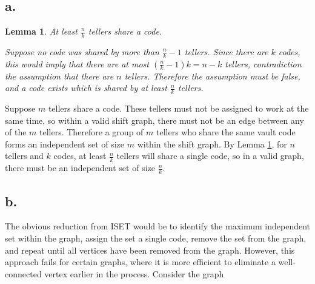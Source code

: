 \documentclass[11pt]{article}
\newtheorem{lem}{Lemma}
\begin{document}
\section{}
\subsection*{a.}
\begin{lem} 
    \label{thm:min-same}  
    At least $\frac{n}{k}$ tellers share a code.

    Suppose no code was shared by more than $\frac{n}{k} - 1$ tellers. Since there are $k$ codes, this would imply that there are at most $(\frac{n}{k} - 1)k = n - k$ tellers, contradiction the assumption that there are $n$ tellers. Therefore the assumption must be false, and a code exists which is shared by at least $\frac{n}{k}$ tellers.
\end{lem}

Suppose $m$ tellers share a code. These tellers must not be assigned to work at the same time, so within a valid shift graph, there must not be an edge between any of the $m$ tellers. Therefore a group of $m$ tellers who share the same vault code forms an independent set of size $m$ within the shift graph. By Lemma \ref{thm:min-same}, for $n$ tellers and $k$ codes, at least $\frac{n}{k}$ tellers will share a single code, so in a valid graph, there must be an independent set of size $\frac{n}{k}$.

\subsection*{b.}
The obvious reduction from ISET would be to identify the maximum independent set within the graph, assign the set a single code, remove the set from the graph, and repeat until all vertices have been removed from the graph. 
 However, this approach fails for certain graphs, where it is more efficient to eliminate a well-connected vertex earlier in the process. Consider the graph 
 \begin{figure}[H]
    \centering
 \end{figure}
\end{document}
